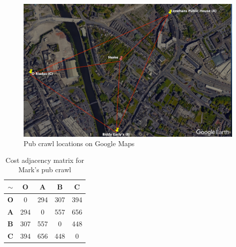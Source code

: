\documentclass[a4paper]{article}
\begin{document}
\begin{displayquote}
    \begin{figure}[H]
        \centering
        \includegraphics[width=130mm,scale=0.5]{images/PubCrawl.png}
        \caption{Pub crawl locations on Google Maps}
        \label{fig:mark}
    \end{figure}
    \begin{table}[H]
        \centering
        \begin{tabular}{c|cccc}
        $\sim$      & \textbf{O} & \textbf{A} & \textbf{B} & \textbf{C} \\ \hline
        \textbf{O}  & 0         & 294         & 307         & 394\\
        \textbf{A} & 294        & 0           & 557         & 656\\
        \textbf{B} & 307        & 557         & 0           & 448\\
        \textbf{C} & 394        & 656         & 448         & 0\\
        \end{tabular}
        \caption{Cost adjacency matrix for Mark's pub crawl
        }
        \label{tab:markCostMatrix}
    \end{table}
\end{displayquote}
\end{document}
